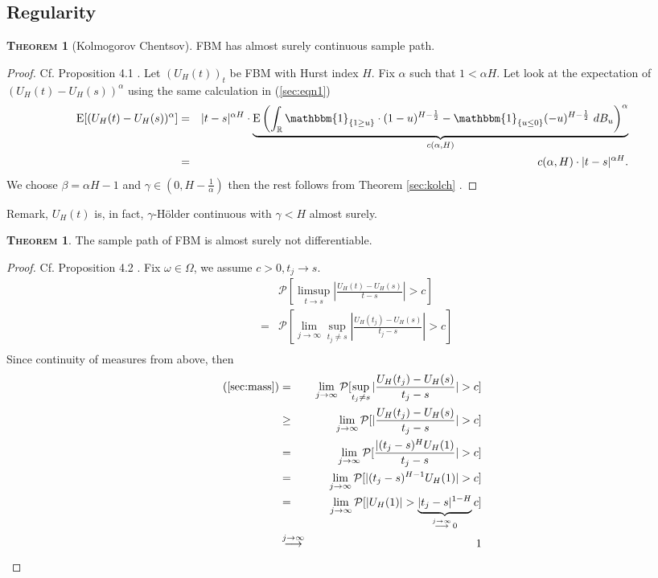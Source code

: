 \documentclass[a4paper, twoside, 11pt]{article}
\theoremstyle{definition}
\newtheorem{theorem}[definition]{\scshape Theorem}
\newcommand{\brkt}[1]{\left({#1} \right)}
\begin{document}
\subsection{Regularity}
\begin{theorem}[Kolmogorov Chentsov]
  FBM has almost surely continuous sample path.  
\end{theorem}

\begin{proof}
  Cf.\cite{mandelbrot} Proposition 4.1 . Let $(U_H(t))_{t}$ be FBM with Hurst index $H$. Fix $\alpha$ such that $1 < \alpha H$. Let look at the expectation of $(U_H(t) - U_H(s))^\alpha$ using the same calculation in (\ref{sec:eqn1})
  \begin{eqnarray}
	\mathrm{E} [(U_H(t) - U_H(s))^\alpha] &=& |t-s|^{\alpha H} \cdot \underbrace{\mathrm{E}\brkt{\int_{\mathbb{R}} \mathbbm{1}_{\{1\ge u\}}\cdot (1-u)^{H-\frac{1}{2}} - \mathbbm{1}_{\{u\le 0\}} (-u)^{H-\frac{1}{2}} \, \mathop{dB_u}}^\alpha}_{c(\alpha,H)}\nonumber\\
	&=& c(\alpha,H) \cdot |t-s|^{\alpha H}.
	\label{sec:eqn5}
  \end{eqnarray}
  We choose $\beta = \alpha H -1$ and $\gamma \in (0, H-\frac{1}{\alpha})$ then the rest follows from Theorem \ref{sec:kolch} .
\end{proof}

Remark, $U_H(t)$ is, in fact, $\gamma$-H\"older continuous with $\gamma < H$ almost surely.

\begin{theorem}
  The sample path of FBM is almost surely not differentiable.
\end{theorem}

\begin{proof}
  Cf. \cite{mandelbrot} Proposition 4.2 . Fix $\omega \in \Omega$, we assume $c > 0, t_j \rightarrow s$.
\begin{eqnarray}
 && \mathcal{P}[\limsup\limits_{t\rightarrow s} |\frac{U_H(t) - U_H(s)}{t-s}| > c]\nonumber\\
 &=& \mathcal{P}[\lim\limits_{j\rightarrow\infty}\sup\limits_{t_j\neq s} |\frac{U_H(t_j) - U_H(s)}{t_j-s}| > c]\nonumber\\
 \label{sec:mass}
 \end{eqnarray}
 Since continuity of measures from above, then
 \begin{eqnarray*}
 \text{(\ref{sec:mass})} &=& \lim\limits_{j\rightarrow\infty} \mathcal{P}[\sup\limits_{t_j\neq s} |\frac{U_H(t_j) - U_H(s)}{t_j-s}| > c]\\
 &\ge& \lim\limits_{j\rightarrow\infty} \mathcal{P}[|\frac{U_H(t_j) - U_H(s)}{t_j-s}| > c]\\
 &=& \lim\limits_{j\rightarrow\infty} \mathcal{P}[\frac{|(t_j-s)^{H}U_H(1)}{t_j - s}| > c]\\
 &=& \lim\limits_{j\rightarrow\infty} \mathcal{P}[|(t_j-s)^{H-1}U_H(1)| > c]\\
 &=& \lim\limits_{j\rightarrow\infty} \mathcal{P}[|U_H(1)| > \underbrace{|t_j - s|^{1-H}}_{\overset{j\rightarrow\infty}{\longrightarrow}\, 0}c]\\
 &\overset{j\rightarrow \infty}{\longrightarrow}& 1 
\end{eqnarray*}
\end{proof}
\end{document}
